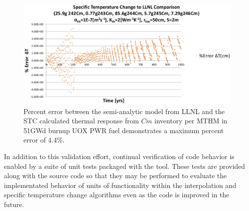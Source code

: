 \begin{figure}[htp!]
\begin{center}
\includegraphics[width=\columnwidth]{./chapters/methodology/thermal_models/CmPercentError.eps}
\end{center}
\caption[STC method validation against LLNL model, percent error]{Percent error between the semi-analytic model from LLNL and the \gls{STC} 
calculated thermal response from $Cm$ inventory per MTHM in 51GWd burnup UOX 
PWR fuel demonstrates a maximum percent error of 4.4\%.}
\label{fig:CmPercentError}
\end{figure}
In addition to this validation effort, continual verification of code behavior 
is enabled by a suite of unit tests packaged with the tool. These tests are 
provided along with the source code so that they may be performed to evaluate 
the implementated behavior of units of functionality within the interpolation 
and specific temperature change algorithms even as the code is improved in the 
future.  
